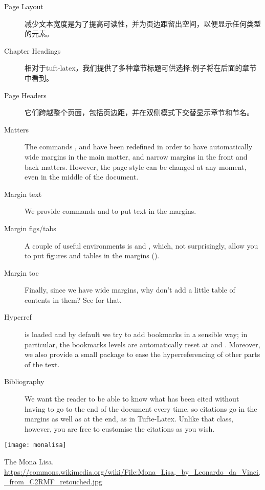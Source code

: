 \begin{description}
	\item[Page Layout] 减少文本宽度是为了提高可读性，并为页边距留出空间，以便显示任何类型的元素。
	\item[Chapter Headings] 相对于tuft-latex，我们提供了多种章节标题可供选择;例子将在后面的章节中看到。
	\item[Page Headers] 它们跨越整个页面，包括页边距，并在双侧模式下交替显示章节和节名。
	\item[Matters] The commands , 
	 and  have been redefined in 
	order to have automatically wide margins in the main matter, and 
	narrow margins in the front and back matters. However, the page 
	style can be changed at any moment, even in the middle of the 
	document.
	\item[Margin text] We provide commands  and 
	 to put text in the 
	margins.
	\item[Margin figs/tabs] A couple of useful environments is 
	 and , which, not 
	surprisingly, allow you to put figures and tables in the margins 
	(\cfr {}).
	\item[Margin toc] Finally, since we have wide margins, why don't add 
	a little table of contents in them? See  for 
	that.
	\item[Hyperref]  is loaded and by default we try 
	to add bookmarks in a sensible way; in particular, the bookmarks 
	levels are automatically reset at  and 
	. Moreover, we also provide a small package to 
	ease the hyperreferencing of other parts of the text.
	\item[Bibliography] We want the reader to be able to know what has 
	been cited without having to go to the end of the document every 
	time, so citations go in the margins as well as at the end, as in 
	Tufte-Latex. Unlike that class, however, you are free to customise 
	the citations as you wish.
\end{description}

\begin{marginfigure}[-5.5cm]
	\texttt{[image: monalisa]}
	\caption[The Mona Lisa]{The Mona Lisa.\\ 
	\url{https://commons.wikimedia.org/wiki/File:Mona_Lisa,_by_Leonardo_da_Vinci,_from_C2RMF_retouched.jpg}}
\end{marginfigure}

